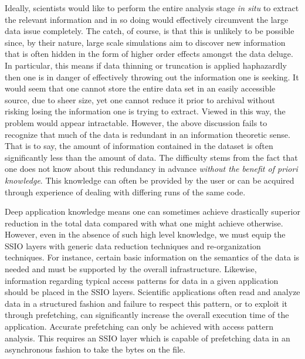 Ideally,  scientists would like to perform the entire analysis stage {\em in situ}
to extract the relevant information and in so doing would effectively
circumvent the large data issue completely.  The catch, of course, is that this
is unlikely to be possible since, by their nature, large scale simulations aim
to discover new information that is often hidden in the form of higher order
effects amongst the data deluge. In particular, this means if data thinning or
truncation is applied haphazardly then one is in danger of effectively throwing
out the information one is seeking. It would seem that one cannot store the
entire data set in an easily accessible source, due to sheer size, yet one
cannot reduce it prior to archival without risking losing the information one
is trying to extract.  Viewed in this way, the problem would appear
intractable. However, the above discussion fails to recognize that much of the
data is redundant in an information theoretic sense.  That is to say, the
amount of information contained in the dataset is often significantly less than
the amount of data.  The difficulty stems from the fact that one does not know
about this redundancy in advance \emph{without the benefit of priori
knowledge}. This knowledge can often be provided by the user or can be acquired
through experience of dealing with differing runs of the same code. 

Deep application knowledge means one can sometimes achieve drastically superior
reduction in the total data compared with what one might achieve otherwise.
However, even in the absence of such high level knowledge, we must equip the
SSIO layers with generic data reduction techniques and re-organization
techniques. For instance, certain basic information on the semantics of the
data is needed and must be supported by the overall infrastructure. Likewise,
information regarding typical access patterns for data in a given application
should be placed in the SSIO layers. Scientific applications often read and
analyze data in a structured fashion and failure to respect this pattern, or to
exploit it through prefetching, can significantly increase the overall
execution time of the application. Accurate prefetching can only be achieved
with access pattern analysis. This requires an SSIO layer which is capable of
prefetching data in an asynchronous fashion to take the bytes on the file.

